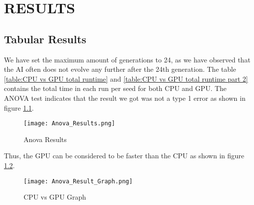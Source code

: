 \chapter{RESULTS}
\section{Tabular Results} 
We have set the maximum amount of generations to 24, as we have observed 
that the AI often does not evolve any further after the 24th generation. The 
table \ref{table:CPU vs GPU total runtime} and 
\ref{table:CPU vs GPU total runtime part 2} contains the total time in each
run per seed for both CPU and GPU. The ANOVA test indicates that the result
we got was not a type 1 error as shown in figure \ref{fig:anova_result}.
\begin{figure}
	\centering
		\graphicspath{{images/}}
		\texttt{[image: Anova\_Results.png]}
	\caption{Anova Results}
	\label{fig:anova_result}
\end{figure}
Thus, the GPU can be considered to be faster than the CPU as shown in figure
\ref{fig:anova_result_graph}.
\begin{figure}
	\centering
		\graphicspath{{images/}}
		\texttt{[image: Anova\_Result\_Graph.png]}
	\caption{CPU vs GPU Graph}
	\label{fig:anova_result_graph}
\end{figure}

